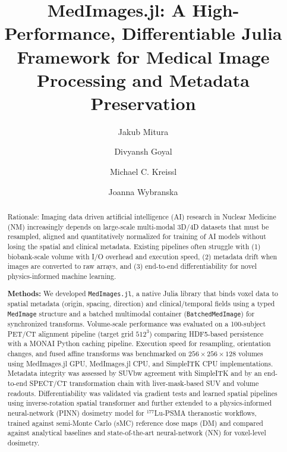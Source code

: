 \documentclass[a4paper,10pt,preprint]{elsarticle}
\begin{document}
\begin{frontmatter}

\title{MedImages.jl: A High-Performance, Differentiable Julia Framework for Medical Image Processing and Metadata Preservation}

\author[1]{Jakub Mitura}

\author[2]{Divyansh Goyal}
\author[1]{Michael C. Kreissl}
\author[1]{Joanna Wybranska}

\address[1]{Division of Nuclear Medicine, Department of Radiology \& Nuclear Medicine, Faculty of Medicine, Otto von Guericke University Magdeburg, 39120 Magdeburg, Germany}
\address[2]{Department of Artificial Intelligence and Machine Learning,
Guru Gobind Singh Indraprastha University, Delhi, India}


\begin{abstract}
Rationale: Imaging data driven artificial intelligence  (AI) research in Nuclear Medicine (NM) increasingly depends on large-scale multi-modal 3D/4D datasets that must be resampled, aligned and quantitatively normalized for training of AI models without losing the spatial and clinical metadata. Existing pipelines often struggle with (1) biobank-scale volume with  I/O overhead and execution speed, (2) metadata drift when images are converted to raw arrays, and (3) end-to-end differentiability for novel physics-informed machine learning.

\textbf{Methods:} We developed \texttt{MedImages.jl}, a native Julia library that binds voxel data to spatial metadata (origin, spacing, direction) and clinical/temporal fields using a typed \texttt{MedImage} structure and a batched multimodal container (\texttt{BatchedMedImage}) for synchronized transforms. Volume-scale performance was evaluated on a 100-subject PET/CT alignment pipeline (target grid $512^3$) comparing HDF5-based persistence with a MONAI Python caching pipeline. Execution speed for resampling, orientation changes, and fused affine transforms was benchmarked on \(256 \times 256 \times 128\) volumes using MedImages.jl GPU, MedImages.jl CPU, and SimpleITK CPU implementations. Metadata integrity was assessed by SUVbw agreement with SimpleITK and by an end-to-end SPECT/CT transformation chain with liver-mask-based SUV and volume readouts. Differentiability was validated via gradient tests and learned spatial pipelines using inverse-rotation spatial transformer and further extended to a physics-informed neural-network (PINN) dosimetry model for \(^{177}\)Lu-PSMA theranostic workflows, trained against semi-Monte Carlo (sMC) reference dose maps (DM) and compared against analytical baselines and state-of-the-art neural-network (NN) for voxel-level dosimetry.


\end{abstract}
\end{frontmatter}
\end{document}
